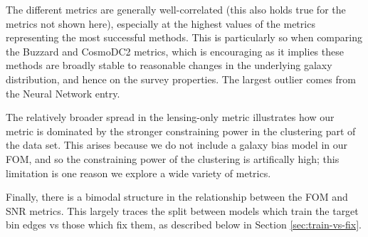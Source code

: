 \documentclass[twocolumn,twocolappendix]{aastex63}
\begin{document}
The different metrics are generally well-correlated (this also holds true for the metrics not 
shown here), especially at the highest values of the metrics representing the most successful
methods. This is particularly so when comparing the Buzzard and CosmoDC2 metrics, which is encouraging 
as it implies these methods are broadly stable to reasonable changes in the underlying galaxy
distribution, and hence on the survey properties.  The largest outlier comes from the 
{\sc Neural Network} entry.

The relatively broader spread in the lensing-only metric illustrates how our metric is dominated
by the stronger constraining power in the clustering part of the data set.  This arises because
we do not include a galaxy bias model in our FOM, and so the constraining power of the clustering
is artifically high; this limitation is one reason we explore a wide variety of metrics.

Finally, there is a bimodal structure in the relationship between the FOM and SNR metrics.
This largely traces the split between models which train the target bin edges vs those
which fix them, as described below in Section \ref{sec:train-vs-fix}.
\end{document}
